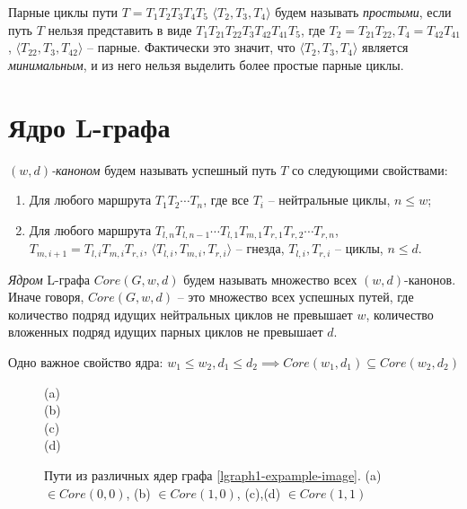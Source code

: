 Парные циклы пути $T = T_1 T_2 T_3 T_4 T_5$ $\langle T_2, T_3, T_4 \rangle$ будем называть \emph{простыми}, если
путь $T$ нельзя представить в виде $T_1 T_{21} T_{22} T_3 T_{42} T_{41} T_5$, где $T_2 = T_{21} T_{22}, T_4 = T_{42} T_{41}$,
$\langle T_{22}, T_3, T_{42} \rangle$ -- парные. Фактически это значит, что $\langle T_2, T_3, T_4\rangle$ является
\emph{минимальным}, и из него нельзя выделить более простые парные циклы.

\section{Ядро L-графа}

\emph{$(w,d)$-каноном} будем называть успешный путь $T$ со следующими свойствами:
\begin{enumerate}[label=\arabic*)]
    \item Для любого маршрута $T_1 T_2 \cdots T_n$, где все $T_i$ -- нейтральные циклы, $n \leq w$;
    \item Для любого маршрута $T_{l,n} T_{l,n-1} \cdots T_{l,1} T_{m,1} T_{r,1} T_{r,2} \cdots T_{r,n}$,\\
       $T_{m,i+1} = T_{l,i} T_{m,i} T_{r,i}$, $\langle T_{l,i}, T_{m,i}, T_{r,i} \rangle$ -- гнезда, $T_{l,i}, T_{r,i}$ -- циклы,
       $n \leq d$.
\end{enumerate}

\emph{Ядром} L-графа $Core(G, w, d)$ будем называть множество всех $(w,d)$-канонов. 
Иначе говоря, $Core(G, w, d)$ -- это множество всех успешных путей, 
где количество подряд идущих нейтральных циклов не превышает $w$, 
количество вложенных подряд идущих парных циклов не превышает $d$.  

Одно важное свойство ядра: $w_1 \leq w_2, d_1 \leq d_2 \implies Core(w_1, d_1) \subseteq Core(w_2, d_2)$

\begin{figure}[h]
    \centering
     (a)\\
     (b)\\
     (c)\\
     (d)\\
    
    \caption{Пути из различных ядер графа \ref{lgraph1-expample-image}. (a) $\in Core(0,0)$, (b) $\in Core(1,0)$, (c),(d) $\in Core(1,1)$}
    \label{lgraph1-core-example}
\end{figure}


